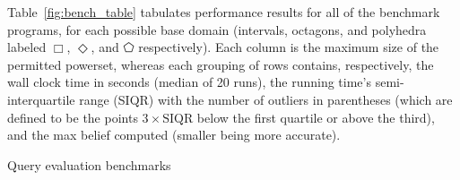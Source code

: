 Table~\ref{fig:bench_table} tabulates performance results for all of
the benchmark programs, for each possible base domain
(intervals, octagons, and polyhedra labeled $ \Box $, $ \Diamond $,
and $ \pentagon $ respectively).  Each column is the maximum size
of the permitted powerset, whereas each grouping of rows contains,
respectively, the wall clock time in seconds (median of 20 runs), the
running time's semi-interquartile range (SIQR) with the number of
outliers in parentheses (which are defined to be the points $
3\times\text{SIQR} $ below the first quartile or above the third), and
the max belief computed (smaller being more accurate).

\pagebreak
\begin{table*}[h!]
\centering
{\tiny }
\addtocounter{table}{-1}
\caption{Query evaluation benchmarks}
\label{fig:bench_table}
\end{table*}
